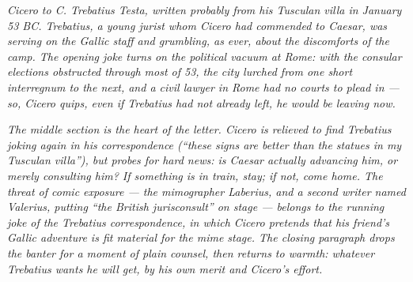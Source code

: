 
\textit{Cicero to C. Trebatius Testa, written probably from his
Tusculan villa in January 53 BC. Trebatius, a young jurist whom
Cicero had commended to Caesar, was serving on the Gallic staff
and grumbling, as ever, about the discomforts of the camp. The
opening joke turns on the political vacuum at Rome: with the
consular elections obstructed through most of 53, the city
lurched from one short \textit{interregnum} to the next, and a
civil lawyer in Rome had no courts to plead in --- so, Cicero
quips, even if Trebatius had not already left, he would be
leaving now.}

\textit{The middle section is the heart of the letter. Cicero is
relieved to find Trebatius joking again in his correspondence
(``these signs are better than the statues in my Tusculan
villa''), but probes for hard news: is Caesar actually advancing
him, or merely consulting him? If something is in train, stay;
if not, come home. The threat of comic exposure --- the mimographer
Laberius, and a second writer named Valerius, putting ``the British
jurisconsult'' on stage --- belongs to the running joke of the
Trebatius correspondence, in which Cicero pretends that his
friend's Gallic adventure is fit material for the mime stage.
The closing paragraph drops the banter for a moment of plain
counsel, then returns to warmth: whatever Trebatius wants he will
get, by his own merit and Cicero's effort.}
